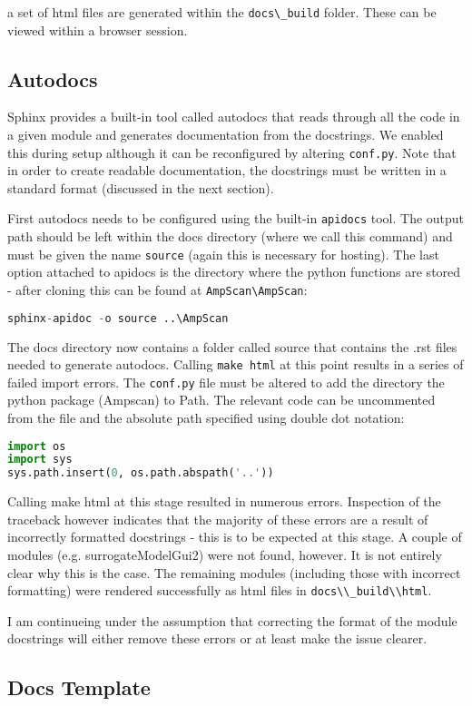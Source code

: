 \documentclass{article}
\begin{document}
a set of html files are generated within the \lstinline{docs\_build} folder. These can be viewed within a browser session.

\subsection{Autodocs}
Sphinx provides a built-in tool called autodocs that reads through all the code in a given module and generates documentation from the docstrings. We enabled this during setup although it can be reconfigured by altering \lstinline{conf.py}. Note that in order to create readable documentation, the docstrings must be written in a standard format (discussed in the next section).

First autodocs needs to be configured using the built-in \lstinline{apidocs} tool. The output path should be left within the docs directory (where we call this command) and must be given the name \lstinline{source} (again this is necessary for hosting). The last option attached to apidocs is the directory where the python functions are stored - after cloning this can be found at \lstinline{AmpScan\AmpScan}:

\begin{lstlisting}[language=Python]
sphinx-apidoc -o source ..\AmpScan
\end{lstlisting}

 The docs directory now contains a folder called source that contains the .rst files needed to generate autodocs. Calling \lstinline{make html} at this point results in a series of failed import errors. The \lstinline{conf.py} file must be altered to add the directory the python package (Ampscan) to Path. The relevant code can be uncommented from the file and the absolute path specified using double dot notation:

\begin{lstlisting}[language=Python]
import os
import sys
sys.path.insert(0, os.path.abspath('..'))
\end{lstlisting}

Calling make html at this stage resulted in numerous errors. Inspection of the traceback however indicates that the majority of these errors are a result of incorrectly formatted docstrings - this is to be expected at this stage. A couple of modules (e.g. surrogateModelGui2) were not found, however. It is not entirely clear why this is the case. The remaining modules (including those with incorrect formatting) were rendered successfully as html files in \lstinline{docs\\_build\\html}.

I am continueing under the assumption that correcting the format of the module docstrings will either remove these errors or at least make the issue clearer.

\subsection{Docs Template}
\end{document}
